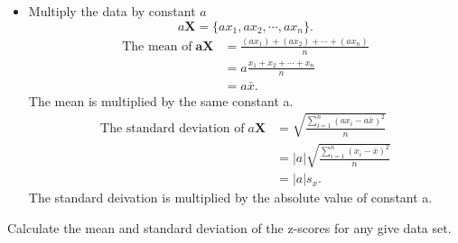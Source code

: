 \documentclass[a4paper, 12pt,twoside]{book}
\begin{document}
\begin{itemize}
\begin{itemize}
\item Multiply the data by constant $a$
$$a\mathbf{X} = \{ax_1, ax_2, \cdots, ax_n\}.$$
\begin{equation*}
\begin{split}
\text{The mean of}\;\mathbf{aX} &= \frac{(ax_1)+(ax_2)+\cdots+(ax_n)}{n}\\
&= a\frac{x_1+x_2+\cdots+x_n}{n}\\
&= a\bar{x}.
\end{split}
\end{equation*}
\colorbox{babypink}{The mean is multiplied by the same constant a.}
\begin{equation*}
\begin{split}
\text{The standard deviation of}\;a\mathbf{X}&= \sqrt{\frac{\sum_{i=1}^n(ax_i-a\bar{x})^2}{n}}\\
&= |a|\sqrt{\frac{\sum_{i=1}^n(x_i-\bar{x})^2}{n}}\\
&= |a|s_x.
\end{split}
\end{equation*}
\colorbox{babypink}{The standard deivation is multiplied by the absolute value of constant a.}
\end{itemize}
\colorbox{dollarbill}{Calculate the mean and standard deviation of the z-scores for any give data set.}
\end{itemize}
\end{document}
